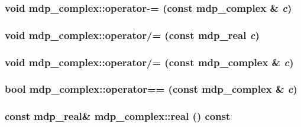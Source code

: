 \hypertarget{classmdp__complex_a1eac5dee207c0bb4cfafa7f02311e819}{
\subsubsection[{operator-\/=}]{\setlength{\rightskip}{0pt plus 5cm}void mdp\_\-complex::operator-\/= (const {\bf mdp\_\-complex} \& {\em c})}}
\label{classmdp__complex_a1eac5dee207c0bb4cfafa7f02311e819}
\hypertarget{classmdp__complex_aa040dd29ac7484eb770f940a4761c435}{
\subsubsection[{operator/=}]{\setlength{\rightskip}{0pt plus 5cm}void mdp\_\-complex::operator/= (const {\bf mdp\_\-real} {\em c})}}
\label{classmdp__complex_aa040dd29ac7484eb770f940a4761c435}
\hypertarget{classmdp__complex_a0dc8af0f39405418b2dacde050e10e5f}{
\subsubsection[{operator/=}]{\setlength{\rightskip}{0pt plus 5cm}void mdp\_\-complex::operator/= (const {\bf mdp\_\-complex} \& {\em c})}}
\label{classmdp__complex_a0dc8af0f39405418b2dacde050e10e5f}
\hypertarget{classmdp__complex_a51ddcf2928115838abd81fd365876d19}{
\subsubsection[{operator==}]{\setlength{\rightskip}{0pt plus 5cm}bool mdp\_\-complex::operator== (const {\bf mdp\_\-complex} \& {\em c})}}
\label{classmdp__complex_a51ddcf2928115838abd81fd365876d19}
\hypertarget{classmdp__complex_a7055611c45f5cfb6e12053d4e9bc77dd}{
\subsubsection[{real}]{\setlength{\rightskip}{0pt plus 5cm}const {\bf mdp\_\-real}\& mdp\_\-complex::real () const}}
